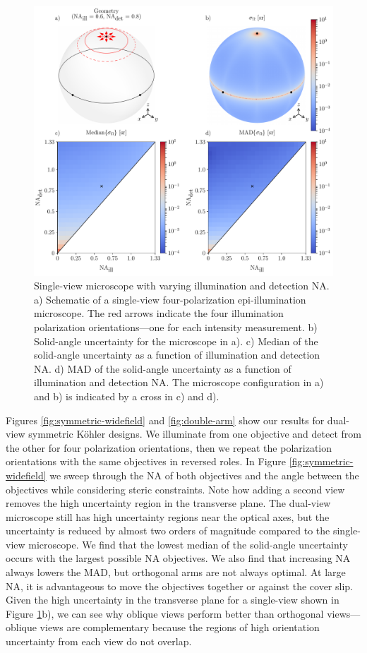 \documentclass[10pt]{article}
\begin{document}
\begin{figure}[htbp]
\centering\includegraphics[width=\textwidth]{single-arm}
\caption{Single-view microscope with varying illumination and detection NA. a)
  Schematic of a single-view four-polarization epi-illumination microscope. The
  red arrows indicate the four illumination polarization orientations---one for
  each intensity measurement. b) Solid-angle uncertainty for the microscope in
  a). c) Median of the solid-angle uncertainty as a function of illumination and
  detection NA. d) MAD of the solid-angle uncertainty as a function of
  illumination and detection NA. The microscope configuration in a) and b) is
  indicated by a cross in c) and d).}
\label{fig:single-arm}
\end{figure}

Figures \ref{fig:symmetric-widefield} and \ref{fig:double-arm} show our results
for dual-view symmetric K\"ohler designs. We illuminate from one objective and
detect from the other for four polarization orientations, then we repeat the
polarization orientations with the same objectives in reversed roles. In Figure
\ref{fig:symmetric-widefield} we sweep through the NA of both objectives and the
angle between the objectives while considering steric constraints. Note how
adding a second view removes the high uncertainty region in the transverse
plane. The dual-view microscope still has high uncertainty regions near the
optical axes, but the uncertainty is reduced by almost two orders of magnitude
compared to the single-view microscope. We find that the lowest median of the
solid-angle uncertainty occurs with the largest possible NA objectives. We also
find that increasing NA always lowers the MAD, but orthogonal arms are not
always optimal. At large NA, it is advantageous to move the objectives together or
against the cover slip. Given the high uncertainty in the transverse plane for a
single-view shown in Figure \ref{fig:single-arm}b), we can see why oblique views
perform better than orthogonal views---oblique views are complementary because
the regions of high orientation uncertainty from each view do not overlap.
\end{document}
